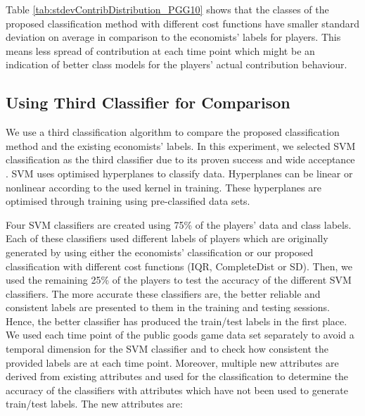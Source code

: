  Table \ref{tab:stdevContribDistribution_PGG10} shows that the classes of the proposed classification method with different cost functions have smaller standard deviation on average in comparison to the economists' labels for players. This means less spread of contribution at each time point which might be an indication of better class models for the players' actual contribution behaviour.


\subsection{Using Third Classifier for Comparison}

We use a third classification algorithm to compare the proposed classification method and the existing economists' labels. In this experiment, we selected SVM classification as the third classifier due to its proven success and wide acceptance  \cite{Bazi2006}. SVM uses optimised hyperplanes to classify data. Hyperplanes can be linear or nonlinear according to the used kernel in training. These hyperplanes are optimised through training using pre-classified data sets.

Four SVM classifiers are created using 75\% of the players' data and class labels. Each of these classifiers used different labels of players which are originally generated by using either the economists' classification or our proposed classification with different cost functions (IQR, CompleteDist or SD). Then, we used the remaining 25\% of the players to test the accuracy of the different SVM classifiers. The more accurate these classifiers are, the better reliable and consistent labels are presented to them in the training and testing sessions.  Hence, the better classifier has produced the train/test labels in the first place. We used each time point of the public goods game data set separately to avoid a temporal dimension for the SVM classifier and to check how consistent the provided labels are at each time point. Moreover, multiple new attributes are derived from existing attributes and used for the classification to determine the accuracy of the classifiers with attributes which have not been used to generate train/test labels. The new attributes are:

